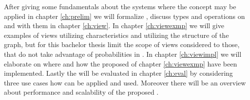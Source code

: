\documentclass[preview]{standalone}
\begin{document}
After giving some fundamentals about the systems where the concept \viewN may be applied in chapter \ref{ch:prelim} we will formalize \viewsN, discuss types and operations on and with them in chapter \ref{ch:view}. In chapter \ref{ch:viewexmp} we will give examples of views utilizing \chgphN characteristics and \viewsN utilizing the structure of the \chgphN graph, but for this bachelor thesis limit the scope of views considered to those, that do not take advantage of probabilities in \chgphsN. In chapter \ref{ch:viewimpl} we will elaborate on where and how the proposed \viewsN of chapter \ref{ch:viewexmp} have been implemented. Lastly the \viewsN will be evaluated in chapter \ref{ch:eval} by considering three use cases how \viewsN can be applied and used. Moreover there will be an overview about performance and scalability of the proposed \viewsN. 

%	
%	
\end{document}
